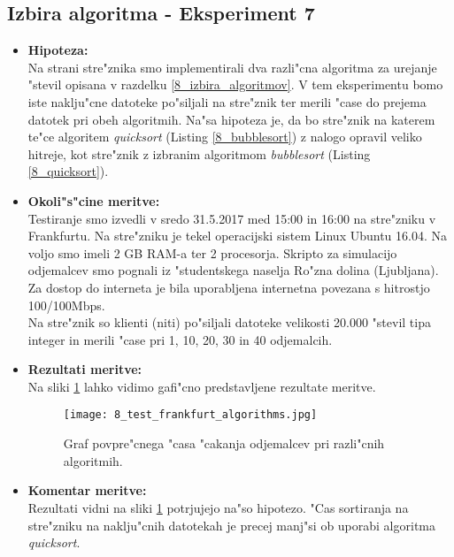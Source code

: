    \subsection{Izbira algoritma - Eksperiment 7}
    \begin{itemize}
    	\item \textbf{Hipoteza: }  \\
    		Na strani stre"znika smo implementirali dva razli"cna algoritma za urejanje "stevil opisana v razdelku \ref{8_izbira_algoritmov}. V tem eksperimentu bomo iste naklju"cne datoteke po"siljali na stre"znik ter merili "case do prejema datotek pri obeh algoritmih.
		Na"sa hipoteza je, da bo stre"znik na katerem te"ce algoritem \textit{quicksort} (Listing \ref{8_bubblesort}) z nalogo opravil veliko hitreje, kot stre"znik z izbranim algoritmom \textit{bubblesort} (Listing \ref{8_quicksort}).

    	\item \textbf{Okoli"s"cine meritve: } \\
    		Testiranje smo izvedli v sredo 31.5.2017 med 15:00 in 16:00 na stre"zniku v Frankfurtu. Na stre"zniku je tekel operacijski sistem Linux Ubuntu 16.04. Na voljo smo imeli 2 GB RAM-a ter 2 procesorja. Skripto za simulacijo odjemalcev smo pognali iz "studentskega naselja Ro"zna dolina (Ljubljana). Za dostop do interneta je bila uporabljena internetna povezana s hitrostjo 100/100Mbps.\\ Na stre"znik so klienti (niti) po"siljali datoteke velikosti 20.000 "stevil tipa integer in merili "case pri 1, 10, 20, 30 in 40 odjemalcih.

     	\item \textbf{Rezultati meritve: }  \\
		Na sliki \ref{8_graf_algorithms} lahko vidimo gafi"cno predstavljene rezultate meritve.
    		\begin{figure}[h]
  		\centering
  		  \texttt{[image: 8\_test\_frankfurt\_algorithms.jpg]}
  		\caption{Graf povpre"cnega "casa "cakanja odjemalcev pri razli"cnih algoritmih. }
  		\label{8_graf_algorithms}
		\end{figure}
    		\newpage

    	\item \textbf{Komentar meritve: } \\
    		Rezultati vidni na sliki  \ref{8_graf_algorithms} potrjujejo na"so hipotezo. "Cas sortiranja na stre"zniku na naklju"cnih datotekah je precej manj"si ob uporabi algoritma \textit{quicksort}.
    \end{itemize}


